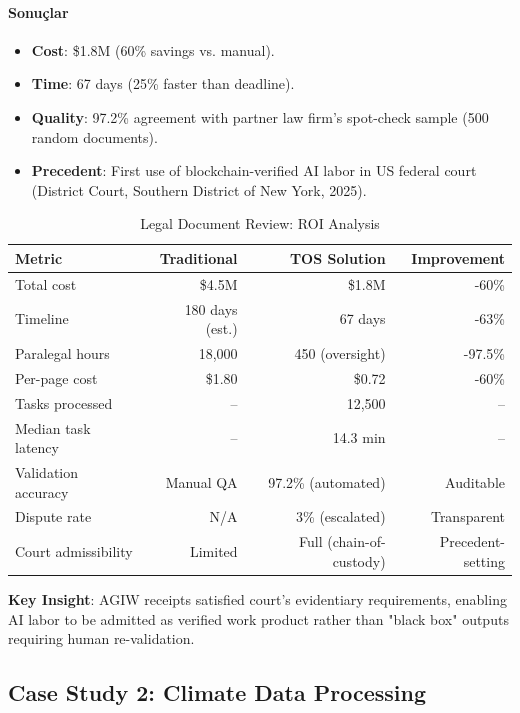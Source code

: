 \documentclass[11pt]{article}
\begin{document}
\begin{itemize}[noitemsep]
\begin{itemize}[noitemsep]
\begin{itemize}[noitemsep]
\begin{itemize}[noitemsep]
\begin{itemize}[noitemsep]
\begin{itemize}[noitemsep]
\begin{itemize}[noitemsep]
\begin{enumerate}[noitemsep]
\begin{itemize}[noitemsep]
\paragraph{Sonuçlar}
\begin{itemize}[noitemsep]
  \item \textbf{Cost}: \$1.8M (60\% savings vs. manual).
  \item \textbf{Time}: 67 days (25\% faster than deadline).
  \item \textbf{Quality}: 97.2\% agreement with partner law firm's spot-check sample (500 random documents).
  \item \textbf{Precedent}: First use of blockchain-verified AI labor in US federal court (District Court, Southern District of New York, 2025).
\end{itemize}

\begin{table}[H]
\centering
\caption{Legal Document Review: ROI Analysis}
\label{tab:legal-roi}
\begin{tabular}{@{}lrrr@{}}
\toprule
\textbf{Metric} & \textbf{Traditional} & \textbf{TOS Solution} & \textbf{Improvement} \\ \midrule
Total cost & \$4.5M & \$1.8M & -60\% \\
Timeline & 180 days (est.) & 67 days & -63\% \\
Paralegal hours & 18,000 & 450 (oversight) & -97.5\% \\
Per-page cost & \$1.80 & \$0.72 & -60\% \\
Tasks processed & -- & 12,500 & -- \\
Median task latency & -- & 14.3 min & -- \\
Validation accuracy & Manual QA & 97.2\% (automated) & Auditable \\
Dispute rate & N/A & 3\% (escalated) & Transparent \\
Court admissibility & Limited & Full (chain-of-custody) & Precedent-setting \\
\bottomrule
\end{tabular}
\end{table}

\textbf{Key Insight}: AGIW receipts satisfied court's evidentiary requirements, enabling AI labor to be admitted as verified work product rather than "black box" outputs requiring human re-validation.

\subsection{Case Study 2: Climate Data Processing}


\end{itemize}
\end{enumerate}
\end{itemize}
\end{itemize}
\end{itemize}
\end{itemize}
\end{itemize}
\end{itemize}
\end{itemize}
\end{document}
